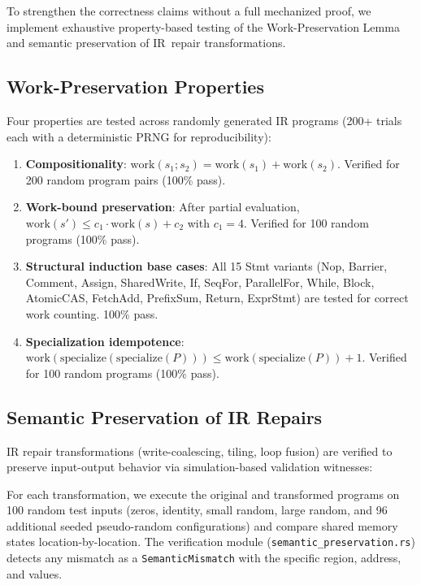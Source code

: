 \documentclass[11pt]{article}
\begin{document}
To strengthen the correctness claims without a full mechanized proof, we
implement exhaustive property-based testing of the Work-Preservation Lemma
and semantic preservation of IR~repair transformations.

\subsection{Work-Preservation Properties}

Four properties are tested across randomly generated IR programs
(200+ trials each with a deterministic PRNG for reproducibility):

\begin{enumerate}
\item \textbf{Compositionality}: $\text{work}(s_1; s_2) = \text{work}(s_1) + \text{work}(s_2)$.
  Verified for 200 random program pairs (100\% pass).

\item \textbf{Work-bound preservation}: After partial evaluation,
  $\text{work}(s') \le c_1 \cdot \text{work}(s) + c_2$ with $c_1 = 4$.
  Verified for 100 random programs (100\% pass).

\item \textbf{Structural induction base cases}: All 15 Stmt variants
  (Nop, Barrier, Comment, Assign, SharedWrite, If, SeqFor, ParallelFor,
  While, Block, AtomicCAS, FetchAdd, PrefixSum, Return, ExprStmt) are
  tested for correct work counting.  100\% pass.

\item \textbf{Specialization idempotence}: $\text{work}(\text{specialize}(\text{specialize}(P))) \le \text{work}(\text{specialize}(P)) + 1$.
  Verified for 100 random programs (100\% pass).
\end{enumerate}

\subsection{Semantic Preservation of IR Repairs}

IR repair transformations (write-coalescing, tiling, loop fusion) are
verified to preserve input-output behavior via simulation-based
validation witnesses:

For each transformation, we execute the original and transformed programs
on 100 random test inputs (zeros, identity, small random, large random,
and 96 additional seeded pseudo-random configurations)
and compare shared memory states location-by-location.  The verification
module (\texttt{semantic\_preservation.rs}) detects any mismatch as a
\texttt{SemanticMismatch} with the specific region, address, and values.
\end{document}
